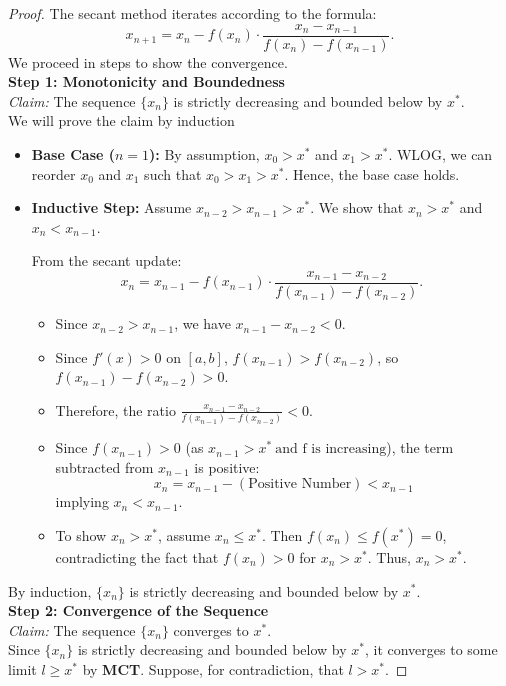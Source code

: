 \documentclass{article}
\begin{document}
\begin{proof}
    The secant method iterates according to the formula:
    \[
        x_{n+1} = x_n - f(x_n) \cdot \frac{x_n - x_{n-1}}{f(x_n) - f(x_{n-1})}.
    \]
    We proceed in steps to show the convergence.
    \\
    \textbf{Step 1: Monotonicity and Boundedness}
    \\
    \textit{Claim: } The sequence \( \{x_n\} \) is strictly decreasing and bounded below by \( x^\ast \).
    \\
    We will prove the claim by induction
    \begin{itemize}
        \item \textbf{Base Case (\( n = 1 \)):} By assumption, \( x_0 > x^\ast \) and \( x_1 > x^\ast \). WLOG, we can reorder \( x_0 \) and \( x_1 \) such that \( x_0 > x_1 > x^\ast \). Hence, the base case holds.
    
        \item \textbf{Inductive Step:} Assume \( x_{n-2} > x_{n-1} > x^\ast \). We show that \( x_n > x^\ast \) and \( x_n < x_{n-1} \).
    
        From the secant update:
        \[
        x_n = x_{n-1} - f(x_{n-1}) \cdot \frac{x_{n-1} - x_{n-2}}{f(x_{n-1}) - f(x_{n-2})}.
        \]
        \begin{itemize}
            \item Since \( x_{n-2} > x_{n-1} \), we have \( x_{n-1} - x_{n-2} < 0 \).
            \item Since \( f'(x) > 0 \) on \([a, b]\), \( f(x_{n-1}) > f(x_{n-2}) \), so \( f(x_{n-1}) - f(x_{n-2}) > 0 \).
            \item Therefore, the ratio \( \frac{x_{n-1} - x_{n-2}}{f(x_{n-1}) - f(x_{n-2})} < 0 \).
            \item Since \( f(x_{n-1}) > 0 \) (as \( x_{n-1} > x^\ast \ \text{and f is increasing} \)), the term subtracted from \( x_{n-1} \) is positive:
            \[ x_n = x_{n-1} - (\text{Positive Number}) < x_{n-1} \]
            implying \( x_n < x_{n-1} \).
            \item To show \( x_n > x^\ast \), assume \( x_n \leq x^\ast \). Then \( f(x_n) \leq f(x^\ast) = 0 \), contradicting the fact that \( f(x_n) > 0 \) for \( x_n > x^\ast \). Thus, \( x_n > x^\ast \).
        \end{itemize}
    \end{itemize}
    By induction, \( \{x_n\} \) is strictly decreasing and bounded below by \( x^\ast \).
    \\
    \textbf{Step 2: Convergence of the Sequence}
    \\
    \textit{Claim: } The sequence \( \{x_n\} \) converges to \( x^\ast \).
    \\
    Since \( \{x_n\} \) is strictly decreasing and bounded below by \( x^\ast \), it converges to some limit \( l \geq x^\ast \) by \textbf{MCT}. Suppose, for contradiction, that \( l > x^\ast \).
    

\end{proof}
\end{document}
